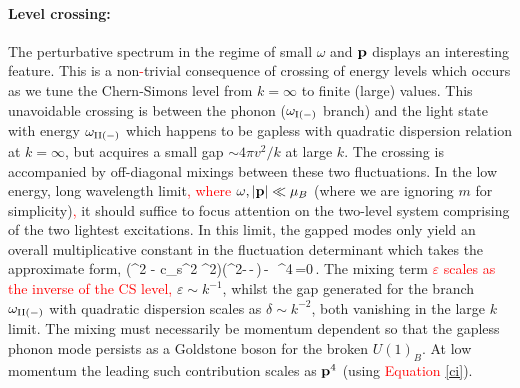 \paragraph{Level crossing:} The perturbative spectrum in the regime of small $\omega$ and ${\bf p}$ displays an interesting feature. This is a non\textcolor{red}{-}trivial consequence of crossing of energy levels which occurs as we tune the Chern-Simons level from $k=\infty$ to finite (large) values. This unavoidable crossing is between the phonon ($\omega_{\rm I (-)}$  branch) and the light state with energy $\omega_{\rm II(-)}$ which happens to be gapless with quadratic dispersion relation at $k=\infty$, but acquires a small gap $\sim 4\pi v^2/k$ at large $k$.  The crossing is accompanied by off-diagonal mixings between these two fluctuations. In the low energy, long wavelength limit\textcolor{red}{, where} $\omega, |{\bf p}| \ll \mu_B$ (where we are ignoring  $m$ for simplicity)\textcolor{red}{,} it should suffice to focus attention on the two-level system comprising of the two lightest excitations. In this limit, the gapped modes only yield an overall multiplicative constant in the fluctuation determinant which takes the approximate form,
\be
\left(\omega^2 - c_s^2 \p^2\right)\left(\omega^2-\,-\,\delta\right)\,-\,\varepsilon\, \p^4\,=0\,.\label{mixing}
\ee
The mixing term \textcolor{red}{$\varepsilon$ scales as the inverse of the CS level,} $\varepsilon\sim k^{-1}$, whilst  the gap generated for the branch $\omega_{\rm II(-)}$ with quadratic dispersion scales as  $\delta\sim k^{-2}$,  both  vanishing in the large $k$ limit.  The mixing must necessarily be momentum dependent so that the gapless phonon mode persists as a Goldstone boson for the broken $U(1)_B$. At low momentum the leading such contribution scales as ${\bf p}^4$ (using \textcolor{red}{Equation} \eqref{ci}). \colorbox{red}{ }
